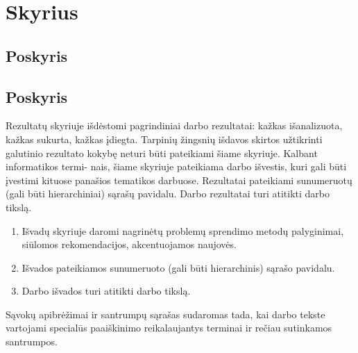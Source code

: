 \documentclass{VUMIFPSbakalaurinis}
\begin{document}
\section{Skyrius}
\subsection{Poskyris}
\subsection{Poskyris}

Rezultatų skyriuje išdėstomi pagrindiniai darbo rezultatai: kažkas išanalizuota,
kažkas sukurta, kažkas įdiegta. Tarpinių žingsnių išdavos skirtos užtikrinti galutinio
rezultato kokybę neturi būti pateikiami šiame skyriuje. Kalbant informatikos termi-
nais, šiame skyriuje pateikiama darbo išvestis, kuri gali būti įvestimi kituose panašios
tematikos darbuose. Rezultatai pateikiami sunumeruotų (gali būti hierarchiniai) sąrašų
pavidalu. Darbo rezultatai turi atitikti darbo tikslą.

\begin{enumerate}[labelindent=0pt]
    \item Išvadų skyriuje daromi nagrinėtų problemų sprendimo metodų palyginimai, siūlomos
rekomendacijos, akcentuojamos naujovės.
    \item Išvados pateikiamos sunumeruoto (gali būti hierarchinis) sąrašo pavidalu.
    \item Darbo išvados turi atitikti darbo tikslą.
\end{enumerate}

\printbibliography[heading=bibintoc]  %

Sąvokų apibrėžimai ir santrumpų sąrašas sudaromas tada, kai darbo tekste
vartojami specialūs paaiškinimo reikalaujantys terminai ir rečiau sutinkamos
santrumpos.
\end{document}
